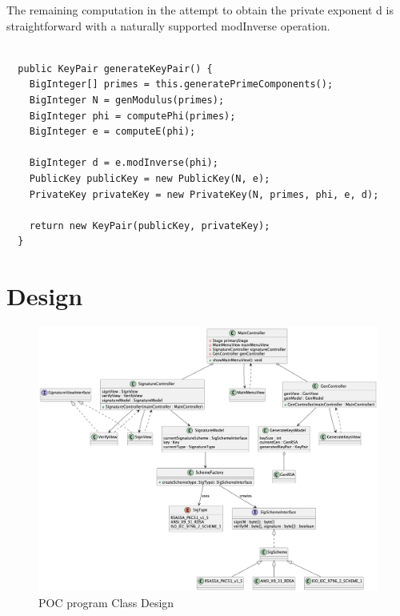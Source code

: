 \documentclass[]{final_report}
\theoremstyle{definition}
\begin{document}
The remaining computation in the attempt to obtain the private exponent d is straightforward with a naturally supported modInverse operation.
\begin{lstlisting}[caption=Java Implementation of Key Generation (\ref{subSec:keygen})]
  
  public KeyPair generateKeyPair() {
    BigInteger[] primes = this.generatePrimeComponents();
    BigInteger N = genModulus(primes);
    BigInteger phi = computePhi(primes);
    BigInteger e = computeE(phi);
    
    BigInteger d = e.modInverse(phi);
    PublicKey publicKey = new PublicKey(N, e);
    PrivateKey privateKey = new PrivateKey(N, primes, phi, e, d);

    return new KeyPair(publicKey, privateKey);
  }

\end{lstlisting}

\section{Design}


\begin{figure}[H]
    \centering
    \includegraphics[width=\textwidth]{poc_pictures/POC.png}
    \caption{POC program Class Design}
    \label{fig:POCCLASSES}
\end{figure}
\end{document}
